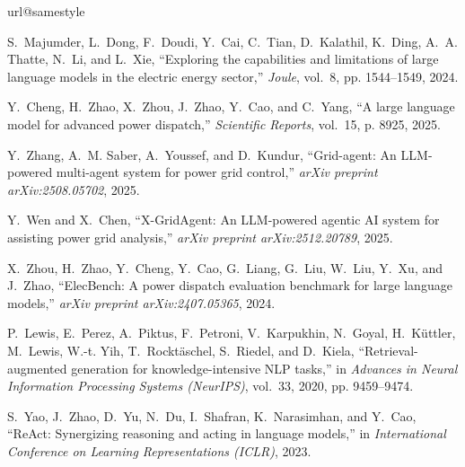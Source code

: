 \providecommand{\url}[1]{#1}
\csname url@samestyle\endcsname
\providecommand{\newblock}{\relax}
\providecommand{\bibinfo}[2]{#2}
\providecommand{\BIBentrySTDinterwordspacing}{\spaceskip=0pt\relax}
\providecommand{\BIBentryALTinterwordstretchfactor}{4}
\providecommand{\BIBentryALTinterwordspacing}{\spaceskip=\fontdimen2\font plus
\BIBentryALTinterwordstretchfactor\fontdimen3\font minus
  \fontdimen4\font\relax}
\providecommand{\BIBforeignlanguage}[2]{{%
\expandafter\ifx\csname l@#1\endcsname\relax
\typeout{** WARNING: IEEEtran.bst: No hyphenation pattern has been}%
\typeout{** loaded for the language `#1'. Using the pattern for}%
\typeout{** the default language instead.}%
\else
\language=\csname l@#1\endcsname
\fi
#2}}
\providecommand{\BIBdecl}{\relax}
\BIBdecl

S.~Majumder, L.~Dong, F.~Doudi, Y.~Cai, C.~Tian, D.~Kalathil, K.~Ding, A.~A.
  Thatte, N.~Li, and L.~Xie, ``Exploring the capabilities and limitations of
  large language models in the electric energy sector,'' \emph{Joule}, vol.~8,
  pp. 1544--1549, 2024.

Y.~Cheng, H.~Zhao, X.~Zhou, J.~Zhao, Y.~Cao, and C.~Yang, ``A large language
  model for advanced power dispatch,'' \emph{Scientific Reports}, vol.~15, p.
  8925, 2025.

Y.~Zhang, A.~M. Saber, A.~Youssef, and D.~Kundur, ``Grid-agent: An
  {LLM}-powered multi-agent system for power grid control,'' \emph{arXiv
  preprint arXiv:2508.05702}, 2025.

Y.~Wen and X.~Chen, ``{X-GridAgent}: An {LLM}-powered agentic {AI} system for
  assisting power grid analysis,'' \emph{arXiv preprint arXiv:2512.20789},
  2025.

X.~Zhou, H.~Zhao, Y.~Cheng, Y.~Cao, G.~Liang, G.~Liu, W.~Liu, Y.~Xu, and
  J.~Zhao, ``{ElecBench}: A power dispatch evaluation benchmark for large
  language models,'' \emph{arXiv preprint arXiv:2407.05365}, 2024.

P.~Lewis, E.~Perez, A.~Piktus, F.~Petroni, V.~Karpukhin, N.~Goyal,
  H.~K{\"u}ttler, M.~Lewis, W.-t. Yih, T.~Rockt{\"a}schel, S.~Riedel, and
  D.~Kiela, ``Retrieval-augmented generation for knowledge-intensive {NLP}
  tasks,'' in \emph{Advances in Neural Information Processing Systems
  (NeurIPS)}, vol.~33, 2020, pp. 9459--9474.

S.~Yao, J.~Zhao, D.~Yu, N.~Du, I.~Shafran, K.~Narasimhan, and Y.~Cao,
  ``{ReAct}: Synergizing reasoning and acting in language models,'' in
  \emph{International Conference on Learning Representations (ICLR)}, 2023.

